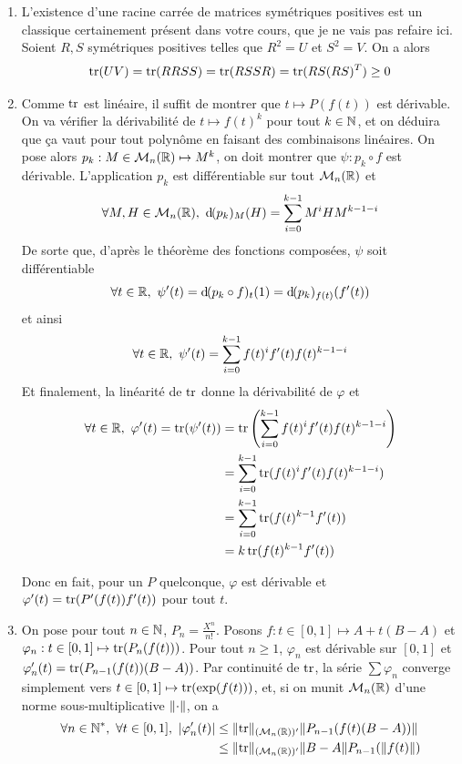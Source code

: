\begin{solution}
	\begin{enumerate}
		\item L'existence d'une racine carrée de matrices symétriques positives est un classique certainement présent dans votre cours, que je ne vais pas refaire ici. 
		Soient $R,S$ symétriques positives telles que $R^2=U$ et $S^2=V$.
		On a alors 
		\[
			\operatorname{tr}(UV)=\operatorname{tr}(RRSS)=\operatorname{tr}(RSSR)=\operatorname{tr}(RS(RS)^T)\geq 0
		\]
		\item Comme $\operatorname{tr}$ est linéaire, il suffit de montrer que $t\mapsto P(f(t))$ est dérivable.
		On va vérifier la dérivabilité de $t\mapsto f(t)^k$ pour tout $k\in\operatorname{\mathbb N}$, 
		et on déduira que ça vaut pour tout polynôme en faisant des combinaisons linéaires.
		On pose alors $p_k:M\in\mathcal M_n(\operatorname{\mathbb R})\mapsto M^k$, on doit montrer que $\psi : p_k\circ f$ est dérivable. 
		L'application $p_k$ est différentiable sur tout $\mathcal M_n(\operatorname{\mathbb R})$ et 
		\[
			\forall M,H\in\mathcal M_n(\operatorname{\mathbb R}),\ \operatorname{d\hskip-1pt}(p_k)_M(H)=\sum_{i=0}^{k-1}M^iHM^{k-1-i}
		\]
		De sorte que, d'après le théorème des fonctions composées, $\psi$ soit différentiable 
		\[
			\forall t\in\R,\ \psi'(t)=\dd(p_k\circ f)_t(1)=\dd(p_k)_{f(t)}(f'(t))
		\]
		et ainsi
		\[
			\forall t\in\R,\ \psi'(t)=\sum_{i=0}^{k-1}f(t)^if'(t)f(t)^{k-1-i}	
		\]
		Et finalement, la linéarité de $\operatorname{tr}$ donne la dérivabilité de $\varphi$ et 
		\begin{align*}
			\forall t\in\R,\ \varphi'(t)=\tr(\psi'(t))  &=\tr\left(\sum_{i=0}^{k-1}f(t)^if'(t)f(t)^{k-1-i}\right)\\
														&=\sum_{i=0}^{k-1}\tr(f(t)^if'(t)f(t)^{k-1-i})\\
														&=\sum_{i=0}^{k-1}\tr(f(t)^{k-1}f'(t))\\
														&=k\tr(f(t)^{k-1}f'(t))
		\end{align*}

		Donc en fait, pour un $P$ quelconque, $\varphi$ est dérivable et $\varphi'(t)=\operatorname{tr}(P'(f(t))f'(t))$ pour tout $t$.

		\item On pose pour tout $n\in\operatorname{\mathbb N}$, $P_n=\frac{X^n}{n!}$.
		Posons $f:t\in[0,1]\mapsto A + t(B-A)$ et $\varphi_n:t\in[0,1]\mapsto\operatorname{tr}(P_n(f(t)))$.
		Pour tout $n\geq 1$, $\varphi_n$ est dérivable sur $[0,1]$ et $\varphi_n'(t)=\operatorname{tr}(P_{n-1}(f(t))(B-A))$.
		Par continuité de $\operatorname{tr}$, la série $\sum\varphi_n$ converge simplement vers $t\in[0,1]\mapsto\operatorname{tr}(\exp(f(t)))$, et,
		si on munit $\mathcal M_n(\operatorname{\mathbb R})$ d'une norme sous-multiplicative $\lVert\cdot\rVert$, on a 
		\begin{align*}
			\forall n\in\operatorname{\mathbb N}^*,\ \forall t\in[0,1],\ |\varphi_n'(t)| &\leq\lVert\operatorname{tr}\rVert_{(\mathcal M_n(\operatorname{\mathbb R}))'}	\lVert P_{n-1}(f(t)(B-A))\rVert\\
																		&\leq\lVert\operatorname{tr}\rVert_{(\mathcal M_n(\operatorname{\mathbb R}))'}\lVert B-A\rVert P_{n-1}(\lVert f(t)\rVert) 
		\end{align*}


\end{enumerate}
\end{solution}

